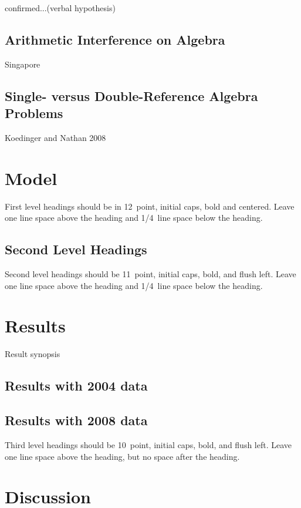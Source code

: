 \documentclass[10pt,letterpaper]{article}
\begin{document}
 confirmed...(verbal hypothesis)

\subsection{Arithmetic Interference on Algebra}

Singapore

\subsection{Single- versus Double-Reference Algebra Problems}

Koedinger and Nathan 2008



\section{Model}

First level headings should be in 12~point, initial caps, bold and
centered. Leave one line space above the heading and 1/4~line space
below the heading.


\subsection{Second Level Headings}

Second level headings should be 11~point, initial caps, bold, and
flush left. Leave one line space above the heading and 1/4~line
space below the heading.

\section{Results}

Result synopsis

\subsection{Results with 2004 data}

\subsection{Results with 2008 data}

Third level headings should be 10~point, initial caps, bold, and flush
left. Leave one line space above the heading, but no space after the
heading.


\section{Discussion}
\end{document}
